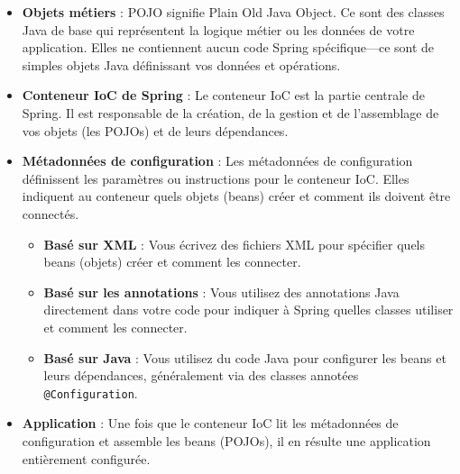 \documentclass{article}
\begin{document}
\begin{itemize}
    \item \textbf{Objets métiers} : POJO signifie Plain Old Java Object. Ce sont des classes Java de base qui représentent la logique métier ou les données de votre application. Elles ne contiennent aucun code Spring spécifique—ce sont de simples objets Java définissant vos données et opérations.

    \item \textbf{Conteneur IoC de Spring} : Le conteneur IoC est la partie centrale de Spring. Il est responsable de la création, de la gestion et de l'assemblage de vos objets (les POJOs) et de leurs dépendances.
    
    \item \textbf{Métadonnées de configuration} : Les métadonnées de configuration définissent les paramètres ou instructions pour le conteneur IoC. Elles indiquent au conteneur quels objets (beans) créer et comment ils doivent être connectés.
    
    \begin{itemize}
        \item \textbf{Basé sur XML} : Vous écrivez des fichiers XML pour spécifier quels beans (objets) créer et comment les connecter.
        \item \textbf{Basé sur les annotations} : Vous utilisez des annotations Java directement dans votre code pour indiquer à Spring quelles classes utiliser et comment les connecter.
        \item \textbf{Basé sur Java} : Vous utilisez du code Java pour configurer les beans et leurs dépendances, généralement via des classes annotées \texttt{@Configuration}.
    \end{itemize}
    
    \item \textbf{Application} : Une fois que le conteneur IoC lit les métadonnées de configuration et assemble les beans (POJOs), il en résulte une application entièrement configurée.
\end{itemize}
\end{document}
